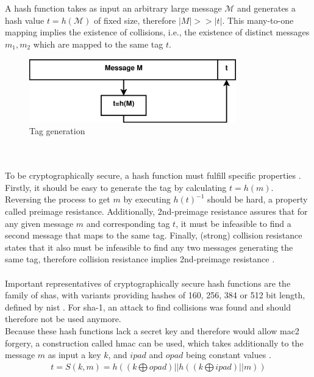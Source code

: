 \\
\\
A hash function takes as input an arbitrary large message $\mathcal{M}$ and generates a hash value $t = h(\mathcal{M})$ of fixed size, therefore $|M| >> |t|$. This many-to-one
mapping implies the existence of collisions, i.e., the existence of distinct messages $m_1, m_2$ which are mapped to the same tag $t$.
\begin{figure}
    \centering
    \includegraphics[width=0.8\textwidth]{figures/tag.eps}
    \caption{Tag generation}
    \label{fig:tag}
\end{figure}
\\
\\
To be cryptographically secure, a hash function must fulfill specific properties \cite{6732428}. Firstly, it should be easy to generate the tag
by calculating $t = h(m)$. Reversing the process to get $m$ by executing $h(t)^{-1}$ should be hard, a property called preimage resistance. 
Additionally, 2nd-preimage resistance assures that for any given message $m$ and corresponding tag $t$, it must be infeasible to find a second message
that maps to the same tag. Finally, (strong) collision resistance states that it also must be infeasible to find any two messages generating
the same tag, therefore collision resistance implies 2nd-preimage resistance \cite{handbookCR}.
\\
\\
Important representatives of cryptographically secure hash functions are the family of \glspl{sha}, with variants providing hashes of 160, 256, 384 or 512 bit 
length, defined by \gls{nist} \cite{nistSHA}. For \gls{sha}-1, an attack to find collisions was found \cite{Wang05findingcollisions} and should therefore not
be used anymore.
\\
Because these hash functions lack a secret key and therefore would allow \gls{mac2} forgery, a construction called \gls{hmac} can be used, which takes 
additionally to the message $m$ as input a key $k$, and $ipad$ and $opad$ being constant values \cite{hmac}.
\begin{align}
 t = S(k, m) = h((k \bigoplus opad) || h((k \bigoplus ipad) || m)) 
\end{align}
